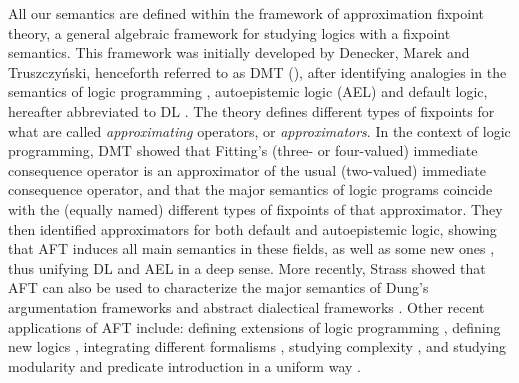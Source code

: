 \documentclass[runningheads]{llncs}
\begin{document}
All our semantics are defined within the framework of approximation fixpoint theory, a general algebraic framework for studying logics with a fixpoint semantics.
This framework was initially developed by Denecker, Marek and Truszczy\'nski, henceforth referred to as DMT (\cite{DeneckerMT00}), after identifying analogies in the semantics of logic programming , autoepistemic logic (AEL) \cite{mo85} and default logic, hereafter abbreviated to DL \cite{ai/Reiter80}.
The theory defines different types of fixpoints for what are called \emph{approximating} operators, or \emph{approximators}.
In the context of logic programming, DMT \cite{DeneckerMT00} showed that Fitting's (three- or four-valued) immediate consequence operator is an approximator of the usual (two-valued) immediate consequence operator, and that the major semantics of logic programs coincide with the (equally named) different types of fixpoints of that approximator.
They then identified approximators for both default and autoepistemic logic, showing that AFT induces all main semantics in these fields, as well as some new ones \cite{DeneckerMT03}, thus unifying DL and AEL in a deep sense.
More recently, Strass \cite{journals/ai/Strass13} showed that AFT can also be used to characterize the major semantics of Dung's argumentation frameworks  and abstract dialectical frameworks .
Other recent applications of AFT include: defining extensions of logic programming \cite{lpnmr/AnticEF13}, defining new logics \cite{iclp/BogaertsVDV14}, integrating different formalisms \cite{RR/BiJF14}, studying complexity \cite{kr/StrassW14}, and studying modularity and predicate introduction in a uniform way \cite{tocl/VennekensGD06,VennekensMWD07a,VennekensMWD07b}. 
\end{document}

